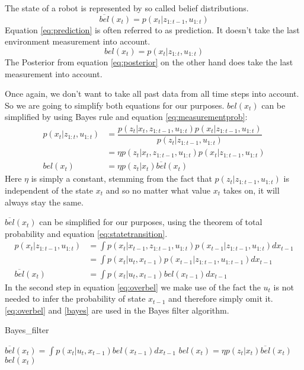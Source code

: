 The state of a robot is represented by so called belief distributions. 
\begin{equation} \label{eq:prediction}
\overline{bel}(x_t) = p(x_t|z_{1:t-1}, u_{1:t})
\end{equation}
Equation \ref{eq:prediction} is often referred to as prediction. It doesn't take the last environment measurement into account. 
\begin{equation} \label{eq:posterior}
bel(x_t) = p(x_t|z_{1:t}, u_{1:t})
\end{equation}
The \gls{Posterior} from equation \ref{eq:posterior} on the other hand does take the last measurement into account\citep[p. 25-26]{Thrun:2005:PR:1121596}.

Once again, we don't want to take all past data from all time steps into account. So we are going to simplify both equations for our purposes. $bel(x_t)$ can be simplified by using Bayes rule and equation \ref{eq:measurementprob}:
\begin{equation}\label{bayes}
\begin{aligned}
p(x_t|z_{1:t}, u_{1:t}) &= \dfrac{p(z_t|x_t,z_{1:t-1},u_{1:t})p(x_t|z_{1:t-1},u_{1:t})}{p(z_t|z_{1:t-1},u_{1:t})}\\
&= \eta p(z_t|x_t,z_{1:t-1},u_{1:t})p(x_t|z_{1:t-1},u_{1:t})\\
bel(x_t) &= \eta p(z_t|x_t)\overline{bel}(x_t)
\end{aligned}
\end{equation}
Here $\eta$ is simply a constant, stemming from the fact that $p(z_t|z_{1:t-1},u_{1:t})$ is independent of the state $x_t$ and so no matter what value $x_t$ takes on, it will always stay the same. 

$\overline{bel}(x_t)$ can be simplified for our purposes, using the theorem of total probability and equation \ref{eq:statetransition}\citep[p. 31-33]{Thrun:2005:PR:1121596}.
\begin{equation} \label{eq:overbel}
\begin{aligned}
p(x_t|z_{1:t-1},u_{1:t}) &= \int p(x_t|x_{t-1},z_{1:t-1},u_{1:t})p(x_{t-1}|z_{1:t-1},u_{1:t})dx_{t-1}\\
&= \int p(x_t|u_t,x_{t-1})p(x_{t-1}|z_{1:t-1},u_{1:t-1})dx_{t-1}\\
\overline{bel}(x_t) &= \int p(x_t|u_t,x_{t-1})bel(x_{t-1})dx_{t-1}
\end{aligned}
\end{equation}
In the second step in equation \ref{eq:overbel} we make use of the fact the $u_t$ is not needed to infer the probability of state $x_{t-1}$ and therefore simply omit it. 
\ref{eq:overbel} and \ref{bayes} are used in the Bayes filter algorithm.
\begin{algorithm}
\caption{Bayes\_filter \citep[p. 27]{Thrun:2005:PR:1121596}}
\label{bayes_filter}
\begin{algorithmic}[1]
\State $\overline{bel}(x_t) = \int p(x_t|u_t,x_{t-1})bel(x_{t-1})dx_{t-1}$
\State $bel(x_t) = \eta p(z_t|x_t)\overline{bel}(x_t)$
\EndFor
\State \Return $bel(x_t)$
\EndProcedure
\end{algorithmic}
\end{algorithm}

